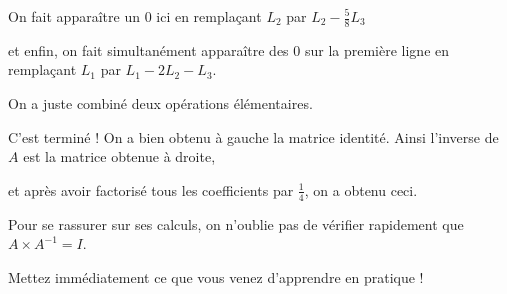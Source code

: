 \change
On fait apparaître un $0$ ici en remplaçant $L_2$ par $L_2-\frac{5}{8} L_3$

\change
et enfin, on fait simultanément apparaître des $0$ sur la première ligne en remplaçant $L_1$ par $L_1-2L_2-L_3$.

On a juste combiné deux opérations élémentaires.

C'est terminé ! 
On a bien obtenu à gauche la matrice identité. Ainsi l'inverse de $A$ est la matrice obtenue à droite,

\change
et après avoir factorisé tous les coefficients par $\frac14$, on a obtenu ceci.

\change
Pour se rassurer sur ses calculs, on n'oublie pas de vérifier rapidement que $A \times A^{-1} = I$.


\diapo
Mettez immédiatement ce que vous venez d'apprendre en pratique !


